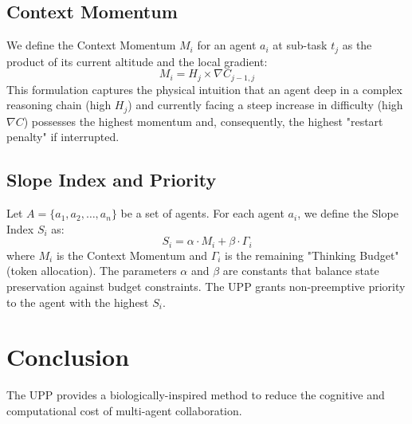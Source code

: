 \documentclass[conference]{IEEEtran}
\begin{document}
\subsection{Context Momentum}
We define the Context Momentum $M_i$ for an agent $a_i$ at sub-task $t_j$ as the product of its current altitude and the local gradient:
\begin{equation}
M_i = H_j \times \nabla C_{j-1, j}
\end{equation}
This formulation captures the physical intuition that an agent deep in a complex reasoning chain (high $H_j$) and currently facing a steep increase in difficulty (high $\nabla C$) possesses the highest momentum and, consequently, the highest "restart penalty" if interrupted.

\subsection{Slope Index and Priority}
Let $A = \{a_1, a_2, \dots, a_n\}$ be a set of agents. For each agent $a_i$, we define the Slope Index $S_i$ as:
\begin{equation}
S_i = \alpha \cdot M_i + \beta \cdot \Gamma_i
\end{equation}
where $M_i$ is the Context Momentum and $\Gamma_i$ is the remaining "Thinking Budget" (token allocation). The parameters $\alpha$ and $\beta$ are constants that balance state preservation against budget constraints. The UPP grants non-preemptive priority to the agent with the highest $S_i$.

\section{Conclusion}
The UPP provides a biologically-inspired method to reduce the cognitive and computational cost of multi-agent collaboration.



\end{document}
